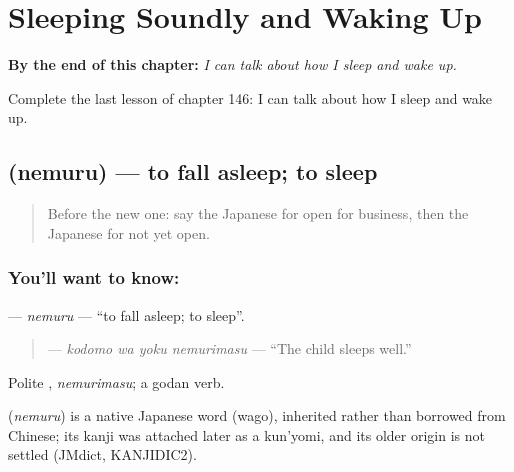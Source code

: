 
\chapter{Sleeping Soundly and Waking Up}
\label{ch:ja-sleeping-soundly-and-waking-up}

\begin{chapteropening}
\textbf{By the end of this chapter:} \emph{I can talk about how I sleep and wake up.}

Complete the last lesson of chapter 146: I can talk about how I sleep and wake up.
\end{chapteropening}

\section[\texorpdfstring{\ja{ねむる} (nemuru)}{ねむる (nemuru)}]{ (nemuru) — to fall asleep; to sleep}

\label{lesson:JA-C146-nemuru}



\begin{quote}
Before the new one: say the Japanese for open for business, then the Japanese for not yet open.
\end{quote}

\subsection*{You'll want to know: }
\textbf{} — \emph{nemuru} — \textquotedblleft{}to fall asleep; to sleep\textquotedblright{}.

\begin{quote}
\textbf{  } — \emph{kodomo wa yoku nemurimasu} — \textquotedblleft{}The child sleeps well.\textquotedblright{}
\end{quote}

Polite \textbf{}, \emph{nemurimasu}; a godan verb.

\begin{cousinweb}
\textbf{} (\emph{nemuru}) is a native Japanese word (wago), inherited rather than borrowed from Chinese; its kanji was attached later as a kun'yomi, and its older origin is not settled (JMdict, KANJIDIC2).
\end{cousinweb}

